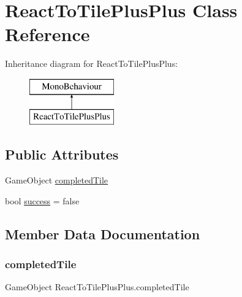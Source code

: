 \hypertarget{class_react_to_tile_plus_plus}{}\section{React\+To\+Tile\+Plus\+Plus Class Reference}
\label{class_react_to_tile_plus_plus}
Inheritance diagram for React\+To\+Tile\+Plus\+Plus\+:\begin{figure}[H]
\begin{center}
\leavevmode
\includegraphics[height=2.000000cm]{class_react_to_tile_plus_plus}
\end{center}
\end{figure}
\subsection*{Public Attributes}
\begin{DoxyCompactItemize}
\item 
Game\+Object \hyperlink{class_react_to_tile_plus_plus_a0392015acd8e3771e528ca227bfaf167}{completed\+Tile}
\item 
bool \hyperlink{class_react_to_tile_plus_plus_aeb6cc8fabd7e21135b345813bcf17bf8}{success} = false
\end{DoxyCompactItemize}


\subsection{Member Data Documentation}
\mbox{\label{class_react_to_tile_plus_plus_a0392015acd8e3771e528ca227bfaf167}} 
\subsubsection{\texorpdfstring{completed\+Tile}{completedTile}}
{\footnotesize\ttfamily Game\+Object React\+To\+Tile\+Plus\+Plus.\+completed\+Tile}

\mbox{\label{class_react_to_tile_plus_plus_aeb6cc8fabd7e21135b345813bcf17bf8}} 
